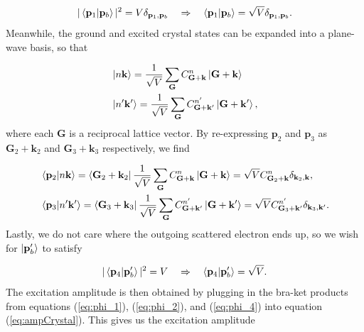 \documentclass[twoside,twocolumn,9pt]{article}
\begin{document}
\begin{equation} 
  \label{eq:phi_1}
    |\bra{\mathbf{p}_1}\ket{\mathbf{p}_b}|^2
    =
    V\delta_{\mathbf{p}_1,\mathbf{p}_b}
    \quad\Rightarrow\quad
    \bra{\mathbf{p}_1}\ket{\mathbf{p}_b}
    =
    \sqrt{V}\delta_{\mathbf{p}_1,\mathbf{p}_b}.
\end{equation}
%
Meanwhile, the ground and excited crystal states can be expanded into a
plane-wave basis, so that

\begin{equation} 
  \begin{aligned}
    &\ket{n\mathbf{k}}
    =
    \frac{1}{\sqrt{V}}\sum_{\mathbf{G}}
    C_{\mathbf{G+k}}^n \ket{\mathbf{G+k}}
    \\& \ket{n'\mathbf{k'}}
    =
    \frac{1}{\sqrt{V}}\sum_{\mathbf{G}}
    C_{\mathbf{G+k'}}^{n'} \ket{\mathbf{G+k'}},
  \end{aligned}
\end{equation}
%
where each $\mathbf{G}$ is a reciprocal lattice vector.
By re-expressing $\mathbf{p}_2$ and $\mathbf{p}_3$ as
$\mathbf{G}_2+\mathbf{k}_2$ and $\mathbf{G}_3 + \mathbf{k}_3$ respectively, we
find

\begin{equation} 
  \label{eq:phi_2} 
  \begin{aligned}
    &\bra{\mathbf{p}_2}\ket{n\mathbf{k}}
    =
    \bra{\mathbf{G}_2 + \mathbf{k}_2}
        \frac{1}{\sqrt{V}}\sum_{\mathbf{G}}
        C_{\mathbf{G+k}}^n \ket{\mathbf{G+k}}
    =
    \sqrt{V}C^n_{\mathbf{G}_2+\mathbf{k}}
    \delta_{\mathbf{k}_2,\mathbf{k}},
    \\&
    \bra{\mathbf{p}_3}\ket{n'\mathbf{k'}}
    =
    \bra{\mathbf{G}_3 + \mathbf{k}_3}
        \frac{1}{\sqrt{V}}\sum_{\mathbf{G}}
        C_{\mathbf{G+k'}}^{n'} \ket{\mathbf{G+k'}}
    =
    \sqrt{V}C^{n'}_{\mathbf{G}_3+\mathbf{k'}}
    \delta_{\mathbf{k}_3,\mathbf{k'}}.
  \end{aligned}
\end{equation}
%
Lastly, we do not care where the outgoing scattered electron ends up, so we
wish for $\ket{\mathbf{p}_b'}$ to satisfy

\begin{equation} 
  \label{eq:phi_4}
    |\bra{\mathbf{p}_4}\ket{\mathbf{p}_b'}|^2
    =
    V \quad\Rightarrow\quad \bra{\mathbf{p}_4}\ket{\mathbf{p}_b'}
    =
    \sqrt{V}.
\end{equation}
%
The excitation amplitude is then obtained by plugging in the bra-ket products
from equations (\ref{eq:phi_1}), (\ref{eq:phi_2}), and (\ref{eq:phi_4}) into
equation (\ref{eq:ampCrystal}).
This gives us the excitation amplitude
\end{document}
